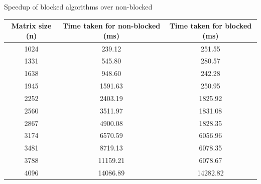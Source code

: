 \documentclass[12pt]{article}
\begin{document}
\begin{section}{Speedup of blocked algorithms over non-blocked}
 \begin{center}
     \begin{tabular}{|c | c | c|}
         \hline
         \textbf{Matrix size (n)} & \textbf{Time taken for non-blocked (ms)} & \textbf{Time taken for blocked (ms)} \\ [0.5ex]
         \hline
         1024                     & 239.12                                   & 251.55                               \\
         \hline
         1331                     & 545.80                                   & 280.57                               \\
         \hline
         1638                     & 948.60                                   & 242.28                               \\
         \hline
         1945                     & 1591.63                                  & 250.95                               \\
         \hline
         2252                     & 2403.19                                  & 1825.92                              \\
         \hline
         2560                     & 3511.97                                  & 1831.08                              \\
         \hline
         2867                     & 4900.08                                  & 1828.35                              \\
         \hline
         3174                     & 6570.59                                  & 6056.96                              \\
         \hline
         3481                     & 8719.13                                  & 6078.35                              \\
         \hline
         3788                     & 11159.21                                 & 6078.67                              \\
         \hline
         4096                     & 14086.89                                 & 14282.82                             \\ [1ex]
         \hline
     \end{tabular}
 \end{center}


\end{section}
\end{document}

